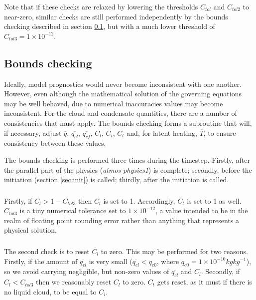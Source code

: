 \documentclass{UMDP_article}
\begin{document}
Note that if these checks are relaxed by lowering the thresholds
$C_{tol}$ and $C_{tol 2}$ to near-zero,
similar checks are still performed independently by the bounds checking
described in section \ref{sec:checks}, but with a much lower
threshold of $C_{tol 3} = 1 \times 10^{-12}$.

\subsection{Bounds checking}
  \label{sec:checks}
Ideally, model prognostics would never become inconsistent with one another.
However, even although the mathematical solution of the governing equations
may be well behaved, due to numerical inaccuracies values may become
inconsistent. For the cloud and condensate quantities, there are a number
of consistencies that must apply. The bounds checking forms a subroutine
that will, if necessary, adjust $\overline{q}$, $\overline{q_{cl}}$,
$\overline{q_{cf}}$, $C_l$, $C_i$, $C_t$ and, for latent heating,
$\overline{T}$, to ensure consistency between these values.

The bounds checking is performed three times during the timestep. Firstly,
after the parallel part of the physics (\textit{atmos-physics1}) is complete;
secondly, before the initiation (section \ref{sec:init}) is called; thirdly,
after the initiation is called. 

\subsubsection{} 
Firstly, if $C_l > 1 - C_{tol 3}$ then $C_l$ is set to 1.
Accordingly, $C_t$ is set to 1 as well.
$C_{tol 3}$ is a tiny numerical tolerance set to $1 \times 10^{-12}$,
a value intended to be in the realm of floating point rounding error rather
than anything that represents a physical solution.

\subsubsection{} 
The second check is to reset $\overline{C_l}$ to zero. This may be performed
for two reasons. Firstly, if the amount of $\overline{q_{cl}}$ is very small
($\overline{q_{cl}} < q_{c0}$, where $q_{c0} = 1 \times 10^{-10} kg kg^{-1}$),
so we avoid carrying negligible, but non-zero values of $\overline{q_{cl}}$
and $C_l$. Secondly, if $C_l < C_{tol 3}$ then we reasonably reset $C_l$ to zero.
$C_t$ gets reset, as it must if there is no liquid cloud, to be equal to $C_i$.
\end{document}
